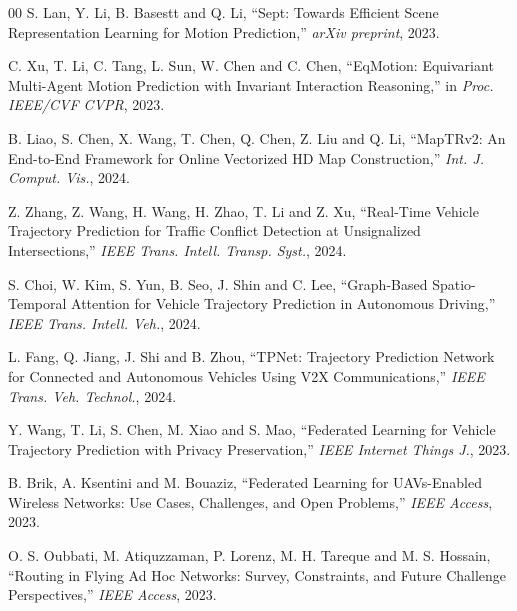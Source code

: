 \documentclass[journal]{IEEEtran}
\begin{document}
\begin{thebibliography}{00}
 S. Lan, Y. Li, B. Basestt and Q. Li, ``Sept: Towards Efficient Scene Representation Learning for Motion Prediction,'' \emph{arXiv preprint}, 2023.

 C. Xu, T. Li, C. Tang, L. Sun, W. Chen and C. Chen, ``EqMotion: Equivariant Multi-Agent Motion Prediction with Invariant Interaction Reasoning,'' in \emph{Proc. IEEE/CVF CVPR}, 2023.

 B. Liao, S. Chen, X. Wang, T. Chen, Q. Chen, Z. Liu and Q. Li, ``MapTRv2: An End-to-End Framework for Online Vectorized HD Map Construction,'' \emph{Int. J. Comput. Vis.}, 2024.

 Z. Zhang, Z. Wang, H. Wang, H. Zhao, T. Li and Z. Xu, ``Real-Time Vehicle Trajectory Prediction for Traffic Conflict Detection at Unsignalized Intersections,'' \emph{IEEE Trans. Intell. Transp. Syst.}, 2024.

 S. Choi, W. Kim, S. Yun, B. Seo, J. Shin and C. Lee, ``Graph-Based Spatio-Temporal Attention for Vehicle Trajectory Prediction in Autonomous Driving,'' \emph{IEEE Trans. Intell. Veh.}, 2024.

 L. Fang, Q. Jiang, J. Shi and B. Zhou, ``TPNet: Trajectory Prediction Network for Connected and Autonomous Vehicles Using V2X Communications,'' \emph{IEEE Trans. Veh. Technol.}, 2024.

 Y. Wang, T. Li, S. Chen, M. Xiao and S. Mao, ``Federated Learning for Vehicle Trajectory Prediction with Privacy Preservation,'' \emph{IEEE Internet Things J.}, 2023.


 B. Brik, A. Ksentini and M. Bouaziz, ``Federated Learning for UAVs-Enabled Wireless Networks: Use Cases, Challenges, and Open Problems,'' \emph{IEEE Access}, 2023.

 O. S. Oubbati, M. Atiquzzaman, P. Lorenz, M. H. Tareque and M. S. Hossain, ``Routing in Flying Ad Hoc Networks: Survey, Constraints, and Future Challenge Perspectives,'' \emph{IEEE Access}, 2023.


\end{thebibliography}
\end{document}
